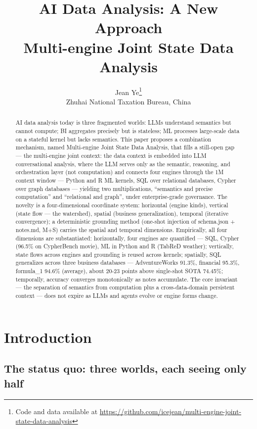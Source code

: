 \documentclass[11pt]{article}
\title{AI Data Analysis: A New Approach\\ \large Multi-engine Joint State Data Analysis}
\author{Jean Ye\thanks{Code and data available at \url{https://github.com/icejean/multi-engine-joint-state-data-analysis}}\\ Zhuhai National Taxation Bureau, China}
\date{}
\begin{document}
\maketitle

\begin{abstract}
AI data analysis today is three fragmented worlds: LLMs understand semantics but cannot compute; BI aggregates precisely but is stateless; ML processes large-scale data on a stateful kernel but lacks semantics. This paper proposes a combination mechanism, named Multi-engine Joint State Data Analysis, that fills a still-open gap --- the multi-engine joint context: the data context is embedded into LLM conversational analysis, where the LLM serves only as the semantic, reasoning, and orchestration layer (not computation) and connects four engines through the 1M context window --- Python and R ML kernels, SQL over relational databases, Cypher over graph databases --- yielding two multiplications, ``semantics and precise computation'' and ``relational and graph'', under enterprise-grade governance. The novelty is a four-dimensional coordinate system: horizontal (engine kinds), vertical (state flow --- the watershed), spatial (business generalization), temporal (iterative convergence); a deterministic grounding method (one-shot injection of schema.json + notes.md, M+S) carries the spatial and temporal dimensions. Empirically, all four dimensions are substantiated: horizontally, four engines are quantified --- SQL, Cypher (96.5\% on CypherBench movie), ML in Python and R (TabReD weather); vertically, state flows across engines and grounding is reused across kernels; spatially, SQL generalizes across three business databases --- AdventureWorks 91.3\%, financial 95.3\%, formula\_1 94.6\% (average), about 20-23 points above single-shot SOTA 74.45\%; temporally, accuracy converges monotonically as notes accumulate. The core invariant --- the separation of semantics from computation plus a cross-data-domain persistent context --- does not expire as LLMs and agents evolve or engine forms change.
\end{abstract}







\section{Introduction}

\subsection{The status quo: three worlds, each seeing only half}
\end{document}
